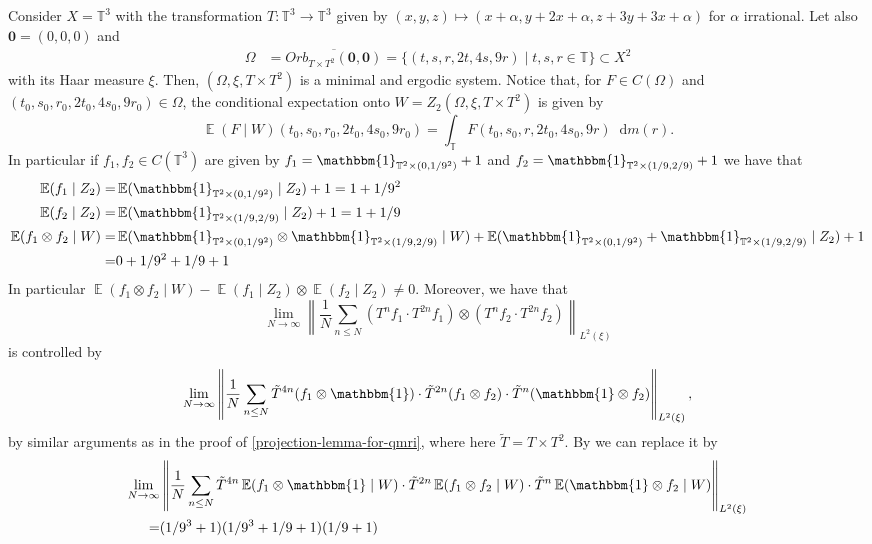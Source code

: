 \documentclass[letter, 11pt]{article}
\theoremstyle{definition}
\theoremstyle{plain}
\newcommand{\T}{\mathbb{T}}
\newcommand{\norm}[1]{\left\lVert#1\right\rVert}
\newcommand*\diff{\mathop{}\!\mathrm{d}}
\providecommand{\norm}[1]{\lVert #1\rVert}
\newcommand{\1}{\mathbbm{1}}
\newcommand{\E}{\operatorname{\mathbb{E}}}
\begin{document}
Consider $X= \T^3$ with the transformation $T\colon \T^3 \to \T^3$ given by $(x,y,z) \mapsto (x + \alpha, y + 2x + \alpha, z+3y+3x+\alpha)$ for $\alpha$ irrational. Let also $\boldsymbol{0} = (0,0,0)$ and
 \begin{align*}
    \Omega &= \overline{Orb_{T\times T^2} (\boldsymbol 0, \boldsymbol0)} = \{(t, s, r, 2t, 4s,9r  ) \mid t, s,r \in \T \} \subset X^2
\end{align*}
with its Haar measure $\xi$. Then, $(\Omega, \xi,T\times T^2)$ is a minimal and ergodic system. Notice that, for $F \in C(\Omega)$ and $(t_0, s_0, r_0, 2t_0, 4s_0 ,9r_0 ) \in \Omega$, the conditional expectation onto $W=Z_2(\Omega, \xi, T\times T^2) $ is given by
\begin{equation*}
    \E( F \mid W) (t_0, s_0, r_0, 2t_0, 4s_0 ,9r_0 ) = \int_{\T} F(t_0, s_0, r, 2t_0, 4s_0 ,9r ) \diff m(r).
\end{equation*}
In particular if $f_1, f_2 \in C(\T^3)$ are given by $f_1=\1_{\T^2 \times (0,1/9^2)} + 1$ and $f_2 = \1_{\T^2 \times (1/9,2/9)} +1$ we have that
\begin{align*}
   \E(f_1\mid Z_2) =& \E( \1_{\T^2 \times (0,1/9^2)} \mid Z_2) + 1 = 1 + 1/9^2 \\
   \E(f_2\mid Z_2) =&  \E( \1_{\T^2 \times (1/9,2/9)} \mid Z_2) + 1 = 1+ 1/9  \\
   \E(f_1 \otimes f_2\mid W) =& \E( \1_{\T^2 \times (0,1/9^2)} \otimes \1_{\T^2 \times (1/9,2/9)} \mid W) +  \E( \1_{\T^2 \times (0,1/9^2)} + \1_{\T^2 \times (1/9,2/9)} \mid Z_2)  + 1 \\
   =& 0 + 1/9^2 + 1/9 +1
\end{align*}
In particular $\E(f_1 \otimes f_2 \mid W) - \E(f_1 \mid Z_2) \otimes \E(f_2 \mid Z_2) \neq 0 $. Moreover, we have that
\begin{equation*}
    \lim_{N \to \infty} \norm{\frac{1}{N} \sum_{n \leq N}(T^n f_1 \cdot T^{2n} f_1) \otimes (T^n f_2 \cdot T^{2n} f_2)  }_{L^2(\xi)}
\end{equation*}
is controlled by 
\begin{equation*}
    \lim_{N \to \infty} \norm{\frac{1}{N} \sum_{n \leq N} \tilde T^{4n} ( f_1\otimes \1) \cdot \tilde T^{2n} ( f_1\otimes f_2) \cdot \tilde T^{n} ( \1 \otimes f_2)  }_{L^2(\xi)},
\end{equation*}
by similar arguments as in the proof of \cref{projection-lemma-for-qmri}, where here $\tilde T = T \times T^2$. By \cite{Host_Kra_nonconventional_averages_nilmanifolds:2005} we can replace it by
\begin{align*}
    \lim_{N \to \infty}& \norm{\frac{1}{N} \sum_{n \leq N} \tilde T^{4n} \E( f_1\otimes \1 \mid W) \cdot \tilde T^{2n} \E( f_1\otimes f_2 \mid W) \cdot \tilde T^{n} \E( \1 \otimes f_2 \mid W)  }_{L^2(\xi)} \\=& (1/9^3  +1)(1/9^3 + 1/9 +1) (1/9 +1)
\end{align*}
\end{document}
